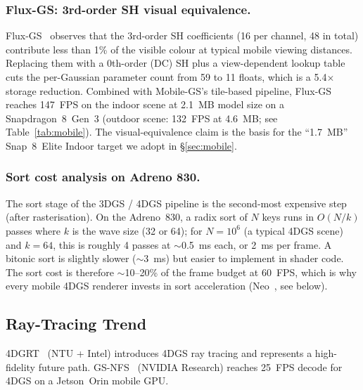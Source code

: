 \subsubsection{Flux-GS: 3rd-order SH visual equivalence.}
Flux-GS~\cite{du2026fluxgs} observes that the 3rd-order SH
coefficients (16 per channel, 48 in total) contribute less than
1\% of the visible colour at typical mobile viewing distances.
Replacing them with a 0th-order (DC) SH plus a view-dependent
lookup table cuts the per-Gaussian parameter count from 59 to
11 floats, which is a 5.4$\times$ storage reduction. Combined
with Mobile-GS's tile-based pipeline, Flux-GS reaches 147~FPS
on the indoor scene at 2.1~MB model size on a Snapdragon~8~Gen~3
(outdoor scene: 132~FPS at 4.6~MB; see
Table~\ref{tab:mobile}).
The visual-equivalence claim is the basis for the
``1.7~MB'' Snap~8~Elite Indoor target we adopt in
\S\ref{sec:mobile}.

\subsubsection{Sort cost analysis on Adreno 830.}
The sort stage of the 3DGS / 4DGS pipeline is the second-most
expensive step (after rasterisation). On the Adreno~830, a
radix sort of $N$ keys runs in $O(N/k)$ passes where $k$ is
the wave size (32 or 64); for $N=10^{6}$ (a typical 4DGS
scene) and $k=64$, this is roughly 4 passes at $\sim$0.5~ms
each, or 2~ms per frame. A bitonic sort is slightly slower
($\sim$3~ms) but easier to implement in shader code. The
sort cost is therefore $\sim$10--20\% of the frame budget at
60~FPS, which is why every mobile 4DGS renderer invests in
sort acceleration (Neo~\cite{oh2025neo}, see below).

\subsection{Ray-Tracing Trend}
4DGRT~\cite{liu20254dgrt} (NTU + Intel) introduces 4DGS ray tracing
and represents a high-fidelity future path. GS-NFS~\cite{ghosh2026gsnfs}
(NVIDIA Research) reaches 25~FPS decode for 4DGS on a Jetson~Orin
mobile GPU.

